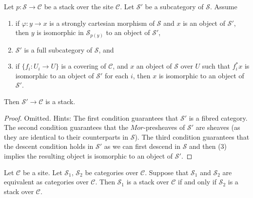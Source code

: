 \begin{lemma}
\label{lemma-substack}
Let $p : \mathcal{S} \to \mathcal{C}$ be a stack over the site $\mathcal{C}$.
Let $\mathcal{S}'$ be a subcategory of $\mathcal{S}$.
Assume
\begin{enumerate}
\item if $\varphi : y \to x$ is a strongly cartesian
morphism of $\mathcal{S}$ and
$x$ is an object of $\mathcal{S}'$, then $y$ is isomorphic in
$\mathcal{S}_{p(y)}$ to an object of $\mathcal{S}'$,
\item $\mathcal{S}'$ is a full subcategory of $\mathcal{S}$, and
\item if $\{f_i : U_i \to U\}$ is a covering of $\mathcal{C}$,
and $x$ an object of $\mathcal{S}$ over $U$ such that $f_i^*x$
is isomorphic to an object of $\mathcal{S}'$ for each $i$,
then $x$ is isomorphic to an object of $\mathcal{S}'$.
\end{enumerate}
Then $\mathcal{S}' \to \mathcal{C}$ is a stack.
\end{lemma}

\begin{proof}
Omitted. Hints:
The first condition guarantees that $\mathcal{S}'$ is a fibred category.
The second condition guarantees that the $\mathit{Mor}$-presheaves
of $\mathcal{S}'$ are sheaves (as they are identical to their counterparts
in $\mathcal{S}$). The third condition guarantees that the descent condition
holds in $\mathcal{S}'$ as we can first descend in $\mathcal{S}$ and
then (3) implies the resulting object is isomorphic to an object of
$\mathcal{S}'$.
\end{proof}

\begin{lemma}
\label{lemma-stack-equivalent}
Let $\mathcal{C}$ be a site.
Let $\mathcal{S}_1$, $\mathcal{S}_2$ be categories over $\mathcal{C}$.
Suppose that $\mathcal{S}_1$ and $\mathcal{S}_2$ are equivalent
as categories over $\mathcal{C}$.
Then $\mathcal{S}_1$ is a stack over $\mathcal{C}$ if and only if
$\mathcal{S}_2$ is a stack over $\mathcal{C}$.
\end{lemma}

